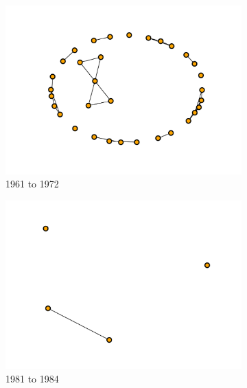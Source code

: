 \documentclass{article}
\begin{document}
\begin{center}
    \begin{figure}[!hbtp]
        \begin{subfigure}{.22\textwidth}
            \includegraphics[width=\textwidth]{./assets/images/network_over_period_0.pdf}
            \caption{1961 to 1972}
        \end{subfigure}
        \begin{subfigure}{.22\textwidth}
            \includegraphics[width=\textwidth]{./assets/images/network_over_period_1.pdf}
            \caption{1981 to 1984}
        \end{subfigure}
        \begin{subfigure}{.22\textwidth}

\end{subfigure}
\end{figure}
\end{center}
\end{document}
